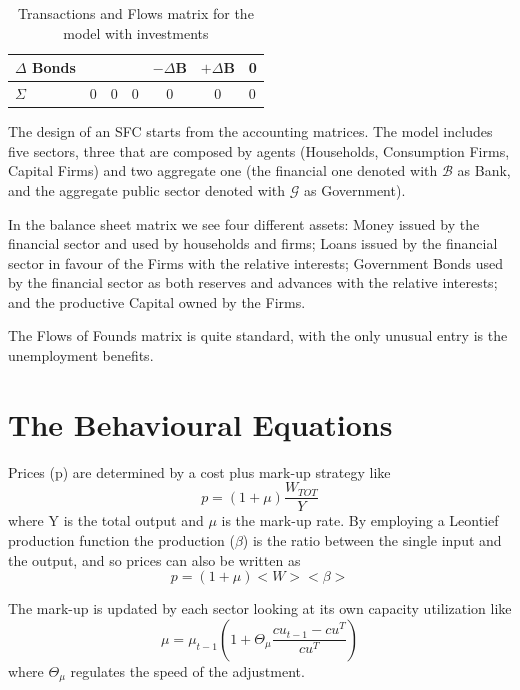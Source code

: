 \documentclass[]{article}
\begin{document}
\begin{table}
\begin{tabular}{l|ccccc|l}
        $\Delta$ Bonds         &                                 &                                                                                                             &                                                                                                             & $-\Delta\mathbf{B}$                                       & $+\Delta\mathbf{B}$ & 0        \\
        \midrule
        $\Sigma$               & 0                               & 0                                                                                                           & 0                                                                                                           & 0                                                         & 0                   & 0        \\
    \end{tabular}
    \caption{Transactions and Flows matrix for the model with investments}
\end{table}

The design of an SFC starts from the accounting matrices. The model includes five sectors, three that are composed by agents (Households, Consumption Firms, Capital Firms) and two aggregate one (the financial one denoted with $\mathcal{B}$ as Bank, and the aggregate public sector denoted with $\mathcal{G}$ as Government).

In the balance sheet matrix we see four different assets: Money issued by the financial sector and used by households and firms; Loans issued by the financial sector in favour of the Firms with the relative interests; Government Bonds used by the financial sector as both reserves and advances with the relative interests; and the productive Capital owned by the Firms.

The Flows of Founds matrix is quite standard, with the only unusual entry is the unemployment benefits.

\section{The Behavioural Equations}
Prices (p) are determined by a cost plus mark-up strategy like $$p = (1 + \mu) \frac{W_{TOT}}{Y}$$ where Y is the total output and $\mu$ is the mark-up rate.
By employing a Leontief production function the production ($\beta$) is the ratio between the single input and the output, and so prices can also be written as $$p= (1+\mu) <W> <\beta>$$

The mark-up is updated by each sector looking at its own capacity utilization like $$\mu = \mu_{t-1} (1 + \Theta_{\mu} \frac{{cu}_{t-1} - {cu}^T}{{cu}^T})$$ where $\Theta_{\mu}$ regulates the speed of the adjustment.
\end{document}
